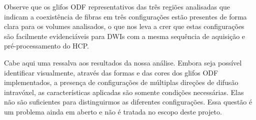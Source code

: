 Observe que os glifos ODF representativos das três regiões analisadas que indicam a coexistência de fibras em três configurações estão presentes de forma clara para os volumes analisados, o que nos leva a crer que estas configurações são facilmente evidenciáveis para DWIs com a mesma sequência de aquisição e pré-processamento do HCP.





Cabe aqui uma ressalva aos resultados da nossa análise. Embora seja possível identificar visualmente, através das formas e das cores dos glifos ODF implementados, a presença de configurações de múltiplas direções de difusão intravóxel, as características aplicadas são somente condições necessárias. Elas não são suficientes para distinguirmos as diferentes configurações. Essa questão é um problema ainda em aberto \cite{SCHILLING2019194} e não é tratada no escopo deste projeto.

